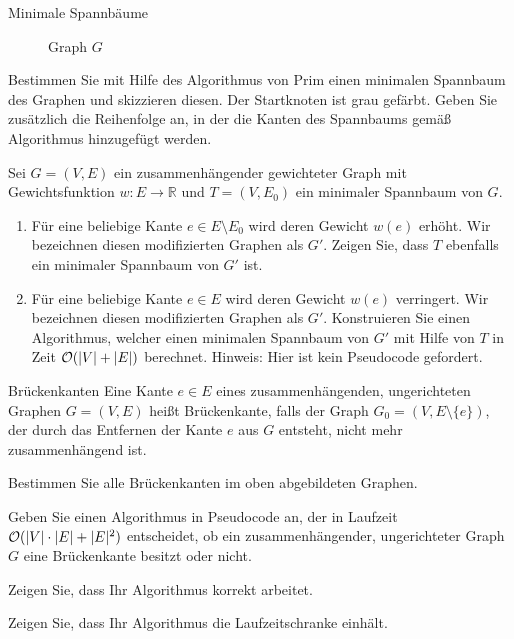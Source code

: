 \documentclass{exercisesheet}
\begin{document}
\begin{eexercises}{Minimale Spannbäume}{
    \begin{figure}[ht]
      \caption{Graph $G$}
      \label{fig:mstgraph}
      \centering
      \tikz[auto, every node/.style={circle, draw, minimum size=.5em}]{
      }
    \end{figure}
  }
  \item Bestimmen Sie mit Hilfe des Algorithmus von Prim einen minimalen Spannbaum des Graphen und skizzieren diesen. Der Startknoten ist grau gefärbt. Geben Sie zusätzlich die Reihenfolge an, in der die Kanten des Spannbaums gemäß Algorithmus hinzugefügt werden.
  \item Sei $G = (V, E)$ ein zusammenhängender gewichteter Graph mit Gewichtsfunktion $w : E \rightarrow \mathbb{R}$ und $T = (V, E_0)$ ein minimaler Spannbaum von $G$.
  \begin{enumerate}
    \item Für eine beliebige Kante $e \in E \setminus E_0$ wird deren Gewicht $w(e)$ erhöht. Wir bezeichnen diesen modifizierten Graphen als $G'$. Zeigen Sie, dass $T$ ebenfalls ein minimaler Spannbaum von $G'$ ist.
    \item Für eine beliebige Kante $e \in E$ wird deren Gewicht $w(e)$ verringert. Wir bezeichnen diesen modifizierten Graphen als $G'$. Konstruieren Sie einen Algorithmus, welcher einen minimalen Spannbaum von $G'$ mit Hilfe von $T$ in Zeit $\mathcal{O}(|V| + |E|)$ berechnet. Hinweis: Hier ist kein Pseudocode gefordert.
  \end{enumerate}
\end{eexercises}

\begin{eexercises}{Brückenkanten}{
    Eine Kante $e \in E$ eines zusammenhängenden, ungerichteten Graphen $G = (V, E)$ heißt Brückenkante, falls der Graph $G_0 = (V, E \setminus \{e\})$, der durch das Entfernen der Kante $e$ aus $G$ entsteht, nicht mehr zusammenhängend ist.
  }
  \item Bestimmen Sie alle Brückenkanten im oben abgebildeten Graphen.
  \item Geben Sie einen Algorithmus in Pseudocode an, der in Laufzeit $\mathcal{O}(|V| \cdot |E| + |E|^2)$ entscheidet, ob ein zusammenhängender, ungerichteter Graph $G$ eine Brückenkante besitzt oder nicht.
  \item Zeigen Sie, dass Ihr Algorithmus korrekt arbeitet.
  \item Zeigen Sie, dass Ihr Algorithmus die Laufzeitschranke einhält.
\end{eexercises}
\end{document}
